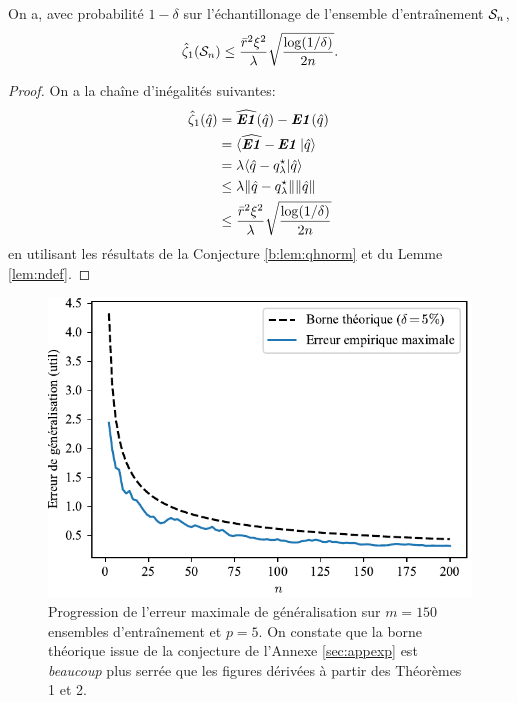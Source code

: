 \begin{conj}
  On a, avec probabilité $1-\delta$ sur l'échantillonage de l'ensemble d'entraînement $\S_n$, 
  \begin{equation}
    \hat\zeta_1(\S_n) \leq \frac{\rmax^2\xi^2}{\lambda}\sqrt\frac{\log(1/\delta)}{2n}.
  \end{equation}
\end{conj}

\begin{proof}
  On a la chaîne d'inégalités suivantes:
  \begin{align}
    \hat\zeta_1(\qh) &= \hEN(\qh) - \EN(\qh)\\
                 &= \langle\hEN - \EN|\qh\rangle\\
                 &= \lambda\langle\qh - \qsl|\qh\rangle\\
                 &\leq \lambda\|\qh - \qsl\|\|\qh\|\\
                 &\leq \frac{\rmax^2\xi^2}{\lambda}\sqrt\frac{\log(1/\delta)}{2n}
  \end{align}
  en utilisant les résultats de la Conjecture \ref{b:lem:qhnorm} et du Lemme
  \ref{lem:ndef}.
\end{proof}

\begin{figure}[p]
  \centering
  \includegraphics[width=\textwidth]{../experiments/fig/conjec.pdf}
  \caption[Erreur de généralisation -- Conjecture]
  {Progression de l'erreur maximale de généralisation sur $m=150$ ensembles
    d'entraînement et $p=5$. On constate que la borne théorique issue de la conjecture de
    l'Annexe \ref{sec:appexp} est \textsl{beaucoup} plus serrée que les figures
    dérivées à partir des Théorèmes 1 et 2.}
  \label{fig_conjec}
\end{figure}


